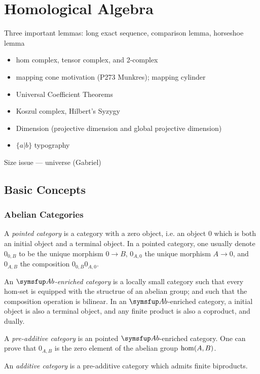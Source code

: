 
\chapter{Homological Algebra}

Three important lemmas: long exact sequence, comparison lemma, horseshoe lemma

\begin{itemize}\color{red}
  \item hom complex, tensor complex, and 2-complex
  \item mapping cone motivation (P273 Munkres); mapping cylinder
  \item Universal Coefficient Theorems
  \item Koszul complex, Hilbert's Syzygy
  \item Dimension (projective dimension and global projective dimension)
  \item $\{a\vert b\}$ typography
\end{itemize}

Size issue --- universe (Gabriel)

\section{Basic Concepts}

\subsection{Abelian Categories}

A \emph{pointed category} is a category with a zero object, i.e. an object 0 which is both an initial object and a terminal object. In a pointed category, one usually denote $0_{0, B}$ to be the unique morphism $0\to B$, $0_{A, 0}$ the unique morphism $A\to 0$, and $0_{A, B}$ the composition $0_{0, B}0_{A, 0}$.

An \emph{$\AB$-enriched category} is a locally small category such that every hom-set is equipped with the structrue of an abelian group; and such that the composition operation is bilinear. In an $\AB$-enriched category, a initial object is also a terminal object, and any finite product is also a coproduct, and dually.

A \emph{pre-additive category} is an pointed $\AB$-enriched category. One can prove that $0_{A,B}$ is the zero element of the abelian group $\operatorname{hom}(A, B)$.

An \emph{additive category} is a pre-additive category which admits finite biproducts.


